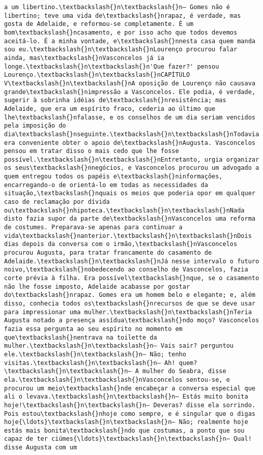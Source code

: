 \begin{Verbatim}[commandchars=\\\{\}]
a um libertino.\textbackslash{}n\textbackslash{}n— Gomes não é libertino; teve uma vida de\textbackslash{}nrapaz, é verdade, mas gosta de Adelaide, e reformou-se completamente. É um bom\textbackslash{}ncasamento, e por isso acho que todos devemos aceitá-lo. É a minha vontade, e\textbackslash{}nnesta casa quem manda sou eu.\textbackslash{}n\textbackslash{}nLourenço procurou falar ainda, mas\textbackslash{}nVasconcelos já ia longe.\textbackslash{}n\textbackslash{}n'Que fazer?' pensou Lourenço.\textbackslash{}n\textbackslash{}nCAPÍTULO V\textbackslash{}n\textbackslash{}nA oposição de Lourenço não causava grande\textbackslash{}nimpressão a Vasconcelos. Ele podia, é verdade, sugerir à sobrinha idéias de\textbackslash{}nresistência; mas Adelaide, que era um espírito fraco, cederia ao último que lhe\textbackslash{}nfalasse, e os conselhos de um dia seriam vencidos pela imposição do dia\textbackslash{}nseguinte.\textbackslash{}n\textbackslash{}nTodavia era conveniente obter o apoio de\textbackslash{}nAugusta. Vasconcelos pensou em tratar disso o mais cedo que lhe fosse possível.\textbackslash{}n\textbackslash{}nEntretanto, urgia organizar os seus\textbackslash{}nnegócios, e Vasconcelos procurou um advogado a quem entregou todos os papéis e\textbackslash{}ninformações, encarregando-o de orientá-lo em todas as necessidades da situação,\textbackslash{}nquais os meios que poderia opor em qualquer caso de reclamação por dívida ou\textbackslash{}nhipoteca.\textbackslash{}n\textbackslash{}nNada disto fazia supor da parte de\textbackslash{}nVasconcelos uma reforma de costumes. Preparava-se apenas para continuar a vida\textbackslash{}nanterior.\textbackslash{}n\textbackslash{}nDois dias depois da conversa com o irmão,\textbackslash{}nVasconcelos procurou Augusta, para tratar francamente do casamento de Adelaide.\textbackslash{}n\textbackslash{}nJá nesse intervalo o futuro noivo,\textbackslash{}nobedecendo ao conselho de Vasconcelos, fazia corte prévia à filha. Era possível\textbackslash{}nque, se o casamento não lhe fosse imposto, Adelaide acabasse por gostar do\textbackslash{}nrapaz. Gomes era um homem belo e elegante; e, além disso, conhecia todos os\textbackslash{}nrecursos de que se deve usar para impressionar uma mulher.\textbackslash{}n\textbackslash{}nTeria Augusta notado a presença assídua\textbackslash{}ndo moço? Vasconcelos fazia essa pergunta ao seu espírito no momento em que\textbackslash{}nentrava na toilette da mulher.\textbackslash{}n\textbackslash{}n— Vais sair? perguntou ele.\textbackslash{}n\textbackslash{}n— Não; tenho visitas.\textbackslash{}n\textbackslash{}n— Ah! quem?\textbackslash{}n\textbackslash{}n— A mulher do Seabra, disse ela.\textbackslash{}n\textbackslash{}nVasconcelos sentou-se, e procurou um meio\textbackslash{}nde encabeçar a conversa especial que ali o levava.\textbackslash{}n\textbackslash{}n— Estás muito bonita hoje!\textbackslash{}n\textbackslash{}n— Deveras? disse ela sorrindo. Pois estou\textbackslash{}nhoje como sempre, e é singular que o digas hoje{\ldots}\textbackslash{}n\textbackslash{}n— Não; realmente hoje estás mais bonita\textbackslash{}ndo que costumas, a ponto que sou capaz de ter ciúmes{\ldots}\textbackslash{}n\textbackslash{}n— Qual! disse Augusta com um 
\end{Verbatim}

